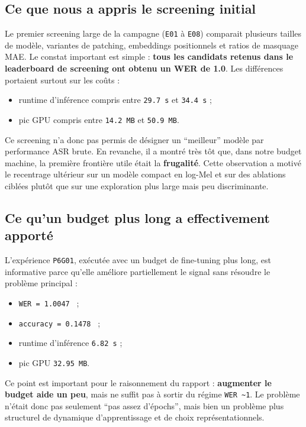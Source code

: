 \documentclass[11pt,a4paper]{article}
\begin{document}
\subsection{Ce que nous a appris le screening initial}
Le premier screening large de la campagne (\texttt{E01} \`a \texttt{E08}) comparait plusieurs tailles de mod\`ele, variantes de patching, embeddings positionnels et ratios de masquage MAE. Le constat important est simple : \textbf{tous les candidats retenus dans le leaderboard de screening ont obtenu un WER de 1.0}. Les diff\'erences portaient surtout sur les co\^uts :
\begin{itemize}[leftmargin=1.2cm]
\item runtime d'inf\'erence compris entre \texttt{29.7 s} et \texttt{34.4 s} ;
\item pic GPU compris entre \texttt{14.2 MB} et \texttt{50.9 MB}.
\end{itemize}

Ce screening n'a donc pas permis de d\'esigner un ``meilleur'' mod\`ele par performance ASR brute. En revanche, il a montr\'e tr\`es t\^ot que, dans notre budget machine, la premi\`ere fronti\`ere utile \'etait la \textbf{frugalit\'e}. Cette observation a motiv\'e le recentrage ult\'erieur sur un mod\`ele compact en log-Mel et sur des ablations cibl\'ees plut\^ot que sur une exploration plus large mais peu discriminante.

\subsection{Ce qu'un budget plus long a effectivement apport\'e}
L'exp\'erience \texttt{P6G01}, ex\'ecut\'ee avec un budget de fine-tuning plus long, est informative parce qu'elle am\'eliore partiellement le signal sans r\'esoudre le probl\`eme principal :
\begin{itemize}[leftmargin=1.2cm]
\item \texttt{WER = 1.0047 } ;
\item \texttt{accuracy = 0.1478 } ;
\item runtime d'inf\'erence \texttt{6.82 s} ;
\item pic GPU \texttt{32.95 MB}.
\end{itemize}

Ce point est important pour le raisonnement du rapport : \textbf{augmenter le budget aide un peu}, mais ne suffit pas \`a sortir du r\'egime \texttt{WER \textasciitilde 1}. Le probl\`eme n'\'etait donc pas seulement ``pas assez d'\'epochs'', mais bien un probl\`eme plus structurel de dynamique d'apprentissage et de choix repr\'esentationnels.
\end{document}
